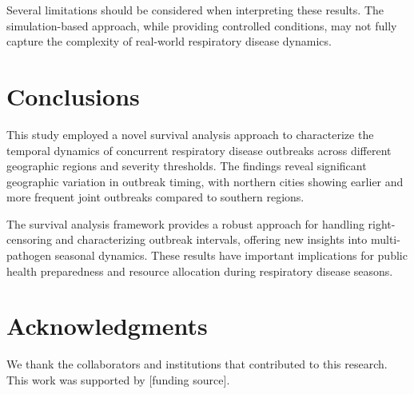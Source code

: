 \documentclass[preprint,12pt]{elsarticle}
\begin{document}
Several limitations should be considered when interpreting these results. The simulation-based approach, while providing controlled conditions, may not fully capture the complexity of real-world respiratory disease dynamics.


\section{Conclusions}


This study employed a novel survival analysis approach to characterize the temporal dynamics of concurrent respiratory disease outbreaks across different geographic regions and severity thresholds. The findings reveal significant geographic variation in outbreak timing, with northern cities showing earlier and more frequent joint outbreaks compared to southern regions.


The survival analysis framework provides a robust approach for handling right-censoring and characterizing outbreak intervals, offering new insights into multi-pathogen seasonal dynamics. These results have important implications for public health preparedness and resource allocation during respiratory disease seasons.


\section*{Acknowledgments}


We thank the collaborators and institutions that contributed to this research. This work was supported by [funding source].




\end{document}
